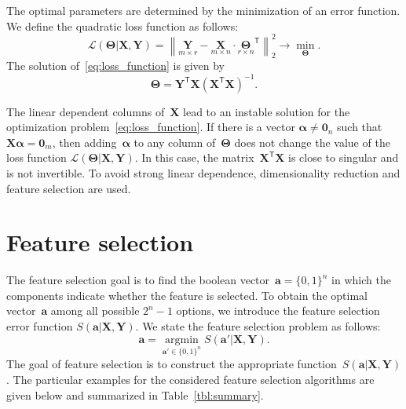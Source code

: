 \documentclass[preprint,12pt]{elsarticle}
\theoremstyle{definition}
\newcommand{\ba}{\mathbf{a}}
\newcommand{\bY}{\mathbf{Y}}
\newcommand{\bX}{\mathbf{X}}
\newcommand{\T}{\mathsf{T}}
\newcommand{\bTheta}{\boldsymbol{\Theta}}
\newcommand{\bZero}{\boldsymbol{0}}
\newcommand{\argmin}{\mathop{\arg \min}\limits}
\begin{document}
The optimal parameters are determined by the minimization of an error function.
We define the quadratic loss function as follows:
\begin{equation}
\mathcal{L}(\bTheta | \bX, \bY) = {\left\| \underset{m \times r}{\mathbf{Y}}  - \underset{m \times n}{\bX} \cdot \underset{r \times n}{\bTheta}^{\T} \right\| }_2^2 \rightarrow\min_{\bTheta}.
\label{eq:loss_function}
\end{equation}
The solution of~\eqref{eq:loss_function} is given by
\begin{equation*}
\bTheta = \bY^{\T} \bX (\bX^{\T} \bX)^{-1}.
\end{equation*}

The linear dependent columns of~$\bX$ lead to an instable solution for the optimization problem~\eqref{eq:loss_function}.
If there is a vector $\boldsymbol{\alpha} \neq \bZero_n$ such that $\bX \boldsymbol{\alpha}= \bZero_m$, then adding~$\boldsymbol{\alpha}$ to any column of~$\bTheta$ does not change the value of the loss function $\mathcal{L}(\bTheta | \bX, \bY)$.
In this case, the matrix~$\bX^{\T} \bX$ is close to singular and is not invertible.
To avoid strong linear dependence, dimensionality reduction and feature selection are used.

\section{Feature selection}

The feature selection goal is to find the boolean vector~$\ba = \{0, 1\}^n$ in which the components indicate whether the feature is selected. 
To obtain the optimal vector~$\ba$ among all possible $2^n - 1$ options, we introduce the feature selection error function $S(\ba | \bX, \bY)$. 
We state the feature selection problem as follows:
\begin{equation}
\ba = \argmin_{\ba' \in \{0, 1\}^n} S(\ba' | \bX, \bY).
\label{eq:feature_selection}
\end{equation}
The goal of feature selection is to construct the appropriate function~$S(\ba | \bX, \bY)$. The particular examples for the considered feature selection algorithms are given below and summarized in Table~\ref{tbl:summary}.
\end{document}
